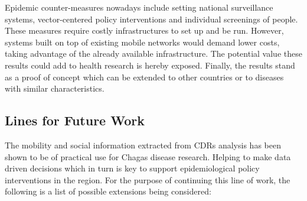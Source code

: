Epidemic counter-measures nowadays include setting national surveillance systems, vector-centered policy interventions and individual screenings of people. These measures require costly infrastructures to set up and be run. However, systems built on top of existing mobile networks would demand lower costs, taking advantage of the already available infrastructure. The potential value these results could add to health research is hereby exposed.
Finally, the results stand as a proof of concept which can be extended to other countries or to diseases with similar characteristics.



\subsection{Lines for Future Work}

The mobility and social information extracted from CDRs analysis has been shown to be of practical use for Chagas disease research. Helping to make data driven decisions which in turn is key to support epidemiological policy interventions in the region. For the purpose of continuing this line of work, the following is a list of possible extensions being considered:

